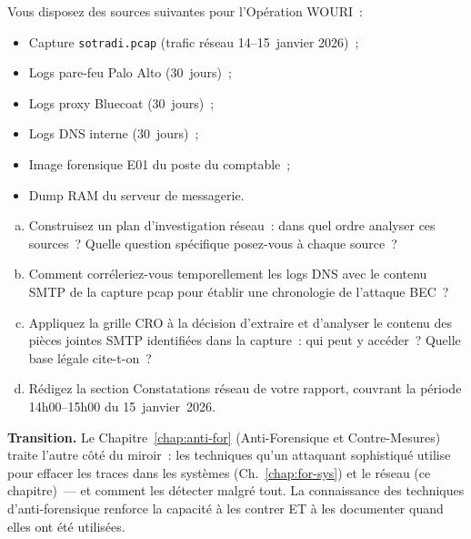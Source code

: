 \begin{boxexo}[title={\ding{45}\quad Exercice~15.3 --- Corrélation multi-sources \niveauexpert}]
Vous disposez des sources suivantes pour l'Opération WOURI~:
\begin{itemize}
    \item Capture \texttt{sotradi.pcap} (trafic réseau 14--15~janvier 2026)~;
    \item Logs pare-feu Palo Alto (30~jours)~;
    \item Logs proxy Bluecoat (30~jours)~;
    \item Logs DNS interne (30~jours)~;
    \item Image forensique E01 du poste du comptable~;
    \item Dump RAM du serveur de messagerie.
\end{itemize}
\begin{enumerate}[(a)]
    \item Construisez un plan d'investigation réseau~: dans quel ordre
          analyser ces sources~? Quelle question spécifique posez-vous
          à chaque source~?
    \item Comment corréleriez-vous temporellement les logs DNS avec
          le contenu SMTP de la capture pcap pour établir une
          chronologie de l'attaque BEC~?
    \item Appliquez la grille CRO à la décision d'extraire et d'analyser
          le contenu des pièces jointes SMTP identifiées dans la
          capture~: qui peut y accéder~? Quelle base légale cite-t-on~?
    \item Rédigez la section Constatations réseau de votre rapport,
          couvrant la période 14h00--15h00 du 15~janvier~2026.
\end{enumerate}
\end{boxexo}

\bigskip

\begin{boxinfo}
\textbf{Transition.} Le Chapitre~\ref{chap:anti-for} (Anti-Forensique
et Contre-Mesures) traite l'autre côté du miroir~: les techniques
qu'un attaquant sophistiqué utilise pour effacer les traces dans les
systèmes (Ch.~\ref{chap:for-sys}) et le réseau (ce chapitre)~---
et comment les détecter malgré tout. La connaissance des techniques
d'anti-forensique renforce la capacité à les contrer ET à les documenter
quand elles ont été utilisées.
\end{boxinfo}
